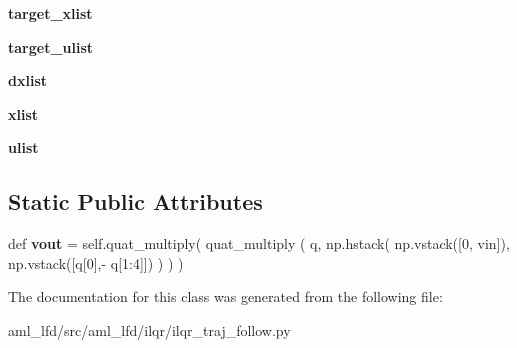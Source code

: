 \begin{DoxyCompactItemize}
{\bfseries target\+\_\+xlist}
\item 
\hypertarget{classaml__lfd_1_1ilqr_1_1ilqr__traj__follow_1_1_d_d_p___traj_follow_class_aca8ae4b641b2fb8838e7892de4c55125}{}\label{classaml__lfd_1_1ilqr_1_1ilqr__traj__follow_1_1_d_d_p___traj_follow_class_aca8ae4b641b2fb8838e7892de4c55125} 
{\bfseries target\+\_\+ulist}
\item 
\hypertarget{classaml__lfd_1_1ilqr_1_1ilqr__traj__follow_1_1_d_d_p___traj_follow_class_a0688bdd96bc836e5de454dc7241d64b8}{}\label{classaml__lfd_1_1ilqr_1_1ilqr__traj__follow_1_1_d_d_p___traj_follow_class_a0688bdd96bc836e5de454dc7241d64b8} 
{\bfseries dxlist}
\item 
\hypertarget{classaml__lfd_1_1ilqr_1_1ilqr__traj__follow_1_1_d_d_p___traj_follow_class_a203438b84d4591e8cb909e85ed4c8c81}{}\label{classaml__lfd_1_1ilqr_1_1ilqr__traj__follow_1_1_d_d_p___traj_follow_class_a203438b84d4591e8cb909e85ed4c8c81} 
{\bfseries xlist}
\item 
\hypertarget{classaml__lfd_1_1ilqr_1_1ilqr__traj__follow_1_1_d_d_p___traj_follow_class_a709d529f4e4e60a53ed5119a42ea8605}{}\label{classaml__lfd_1_1ilqr_1_1ilqr__traj__follow_1_1_d_d_p___traj_follow_class_a709d529f4e4e60a53ed5119a42ea8605} 
{\bfseries ulist}
\end{DoxyCompactItemize}
\subsection*{Static Public Attributes}
\begin{DoxyCompactItemize}
\item 
\hypertarget{classaml__lfd_1_1ilqr_1_1ilqr__traj__follow_1_1_d_d_p___traj_follow_class_a141c4c6e73bf63eedb6b44afdd2a1661}{}\label{classaml__lfd_1_1ilqr_1_1ilqr__traj__follow_1_1_d_d_p___traj_follow_class_a141c4c6e73bf63eedb6b44afdd2a1661} 
def {\bfseries vout} = self.\+quat\+\_\+multiply( quat\+\_\+multiply ( q, np.\+hstack( np.\+vstack(\mbox{[}0, vin\mbox{]}), np.\+vstack(\mbox{[}q\mbox{[}0\mbox{]},-\/ q\mbox{[}1\+:4\mbox{]}\mbox{]}) ) ) )
\end{DoxyCompactItemize}


The documentation for this class was generated from the following file\+:\begin{DoxyCompactItemize}
\item 
aml\+\_\+lfd/src/aml\+\_\+lfd/ilqr/ilqr\+\_\+traj\+\_\+follow.\+py\end{DoxyCompactItemize}
